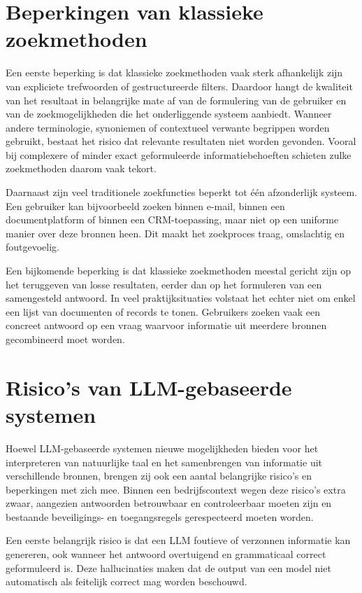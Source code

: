 \section{Beperkingen van klassieke zoekmethoden}
\label{sec:beperkingen-klassiek}

Een eerste beperking is dat klassieke zoekmethoden vaak sterk afhankelijk zijn van expliciete trefwoorden of gestructureerde filters. Daardoor hangt de kwaliteit van het resultaat in belangrijke mate af van de formulering van de gebruiker en van de zoekmogelijkheden die het onderliggende systeem aanbiedt. Wanneer andere terminologie, synoniemen of contextueel verwante begrippen worden gebruikt, bestaat het risico dat relevante resultaten niet worden gevonden. Vooral bij complexere of minder exact geformuleerde informatiebehoeften schieten zulke zoekmethoden daarom vaak tekort.

Daarnaast zijn veel traditionele zoekfuncties beperkt tot één afzonderlijk systeem. Een gebruiker kan bijvoorbeeld zoeken binnen e-mail, binnen een documentplatform of binnen een \gls{CRM}-toepassing, maar niet op een uniforme manier over deze bronnen heen. Dit maakt het zoekproces traag, omslachtig en foutgevoelig.

Een bijkomende beperking is dat klassieke zoekmethoden meestal gericht zijn op het teruggeven van losse resultaten, eerder dan op het formuleren van een samengesteld antwoord. In veel praktijksituaties volstaat het echter niet om enkel een lijst van documenten of records te tonen. Gebruikers zoeken vaak een concreet antwoord op een vraag waarvoor informatie uit meerdere bronnen gecombineerd moet worden.

\section{Risico's van LLM-gebaseerde systemen}
\label{sec:risicos-llm}

Hoewel \gls{LLM}-gebaseerde systemen nieuwe mogelijkheden bieden voor het interpreteren van natuurlijke taal en het samenbrengen van informatie uit verschillende bronnen, brengen zij ook een aantal belangrijke risico's en beperkingen met zich mee. Binnen een bedrijfscontext wegen deze risico's extra zwaar, aangezien antwoorden betrouwbaar en controleerbaar moeten zijn en bestaande beveiligings- en toegangsregels gerespecteerd moeten worden.

Een eerste belangrijk risico is dat een \gls{LLM} foutieve of verzonnen informatie kan genereren, ook wanneer het antwoord overtuigend en grammaticaal correct geformuleerd is. Deze hallucinaties maken dat de output van een model niet automatisch als feitelijk correct mag worden beschouwd.

